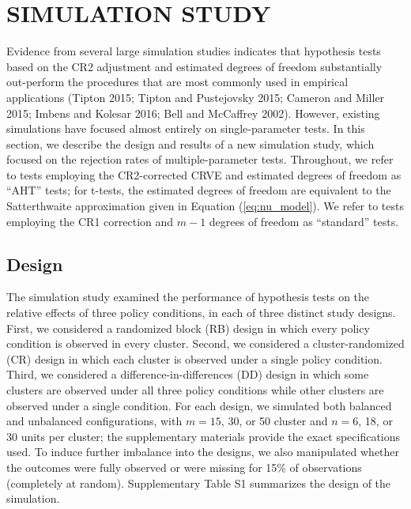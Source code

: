 \documentclass[12pt]{article}
\begin{document}
\hypertarget{sec:simulation}{%
\section{SIMULATION STUDY}\label{sec:simulation}}

Evidence from several large simulation studies indicates that hypothesis
tests based on the CR2 adjustment and estimated degrees of freedom
substantially out-perform the procedures that are most commonly used in
empirical applications (Tipton 2015; Tipton and Pustejovsky 2015;
Cameron and Miller 2015; Imbens and Kolesar 2016; Bell and McCaffrey
2002). However, existing simulations have focused almost entirely on
single-parameter tests. In this section, we describe the design and
results of a new simulation study, which focused on the rejection rates
of multiple-parameter tests. Throughout, we refer to tests employing the
CR2-corrected CRVE and estimated degrees of freedom as ``AHT'' tests;
for t-tests, the estimated degrees of freedom are equivalent to the
Satterthwaite approximation given in Equation (\ref{eq:nu_model}). We
refer to tests employing the CR1 correction and \(m - 1\) degrees of
freedom as ``standard'' tests.

\hypertarget{design}{%
\subsection{Design}\label{design}}

The simulation study examined the performance of hypothesis tests on the
relative effects of three policy conditions, in each of three distinct
study designs. First, we considered a randomized block (RB) design in
which every policy condition is observed in every cluster. Second, we
considered a cluster-randomized (CR) design in which each cluster is
observed under a single policy condition. Third, we considered a
difference-in-differences (DD) design in which some clusters are
observed under all three policy conditions while other clusters are
observed under a single condition. For each design, we simulated both
balanced and unbalanced configurations, with \(m = 15\), 30, or 50
cluster and \(n = 6\), 18, or 30 units per cluster; the supplementary
materials provide the exact specifications used. To induce further
imbalance into the designs, we also manipulated whether the outcomes
were fully observed or were missing for 15\% of observations (completely
at random). Supplementary Table S1 summarizes the design of the
simulation.
\end{document}
